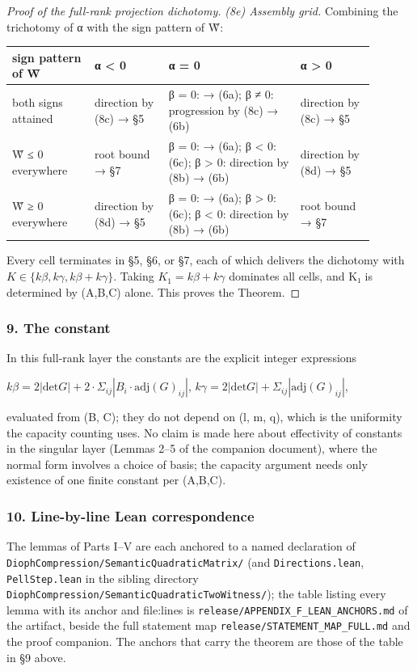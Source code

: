 \begin{proof}[Proof of the full-rank projection dichotomy]
\emph{(8e) Assembly grid.} Combining the trichotomy of α with the sign pattern of W̃:

\begin{longtable}{@{}>{\raggedright\arraybackslash}p{0.201\linewidth}>{\raggedright\arraybackslash}p{0.182\linewidth}>{\raggedright\arraybackslash}p{0.329\linewidth}>{\raggedright\arraybackslash}p{0.182\linewidth}@{}}
\toprule
sign pattern of W̃ & α < 0 & α = 0 & α > 0 \\
\midrule\endhead
both signs attained & direction by (8c) → §5 & β = 0: → (6a); β ≠ 0: progression by (8c) → (6b) & direction by (8c) → §5 \\
W̃ ≤ 0 everywhere & root bound → §7 & β = 0: → (6a); β < 0: (6c); β > 0: direction by (8b) → (6b) & direction by (8d) → §5 \\
W̃ ≥ 0 everywhere & direction by (8d) → §5 & β = 0: → (6a); β > 0: (6c); β < 0: direction by (8b) → (6b) & root bound → §7 \\
\bottomrule
\end{longtable}
Every cell terminates in §5, §6, or §7, each of which delivers the dichotomy with $K ∈ \{kβ, kγ, kβ+kγ\}$. Taking $K_{1} = kβ + kγ$ dominates all cells, and K₁ is determined by (A,B,C) alone. This proves the Theorem.

\end{proof}
\subsubsection*{9. The constant}
In this full-rank layer the constants are the explicit integer expressions

$kβ = 2|\mathrm{det} G| + 2·Σ_{ij} |B_{i}·\mathrm{adj}(G)_{ij}|$,   $kγ = 2|\mathrm{det} G| + Σ_{ij} |\mathrm{adj}(G)_{ij}|$,

evaluated from (B, C); they do not depend on (l, m, q), which is the uniformity the capacity counting uses. No claim is made here about effectivity of constants in the singular layer (Lemmas 2–5 of the companion document), where the normal form involves a choice of basis; the capacity argument needs only existence of one finite constant per (A,B,C).

\subsubsection*{10. Line-by-line Lean correspondence}
The lemmas of Parts I--V are each anchored to a named declaration of \texttt{DiophCompression/SemanticQuadraticMatrix/} (and \texttt{Directions.\allowbreak{}lean}, \texttt{PellStep.\allowbreak{}lean} in the sibling directory \texttt{DiophCompression/SemanticQuadraticTwoWitness/}); the table listing every lemma with its anchor and file:lines is \texttt{release/APPENDIX\_\allowbreak{}F\_\allowbreak{}LEAN\_\allowbreak{}ANCHORS.\allowbreak{}md} of the artifact, beside the full statement map \texttt{release/STATEMENT\_\allowbreak{}MAP\_\allowbreak{}FULL.\allowbreak{}md} and the proof companion. The anchors that carry the theorem are those of the table in §9 above.
